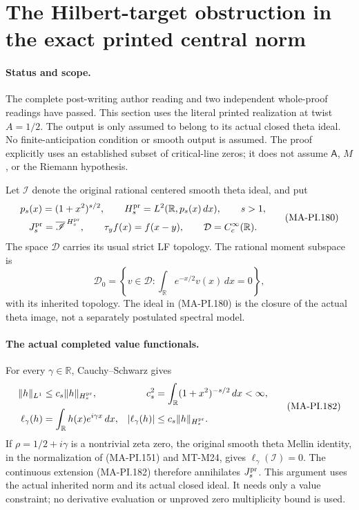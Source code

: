 \section{The Hilbert-target obstruction in the exact printed central norm}
\label{sec:printed-hilbert-cutoff-obstruction}

\paragraph{Status and scope.}
The complete post-writing author reading and two independent
whole-proof readings have passed.
This section uses the literal printed realization at twist \(A=1/2\).
The output is only assumed to belong to its actual closed theta ideal.
No finite-anticipation condition or smooth output is assumed.
The proof explicitly uses an established subset of critical-line zeros;
it does not assume \(\mathsf A\), \(M\), or the Riemann hypothesis.

Let \(\mathscr I\) denote the original rational centered smooth theta
ideal, and put
\[
 \begin{gathered}
 p_s(x)=(1+x^2)^{s/2},\qquad
 H_s^{\rm pr}=L^2(\mathbb R,p_s(x)\,dx),\qquad s>1,\\
 J_s^{\rm pr}=\overline{\mathscr I}^{\,H_s^{\rm pr}},\qquad
 \tau_yf(x)=f(x-y),\qquad \mathcal D=C_c^\infty(\mathbb R).
 \end{gathered}
 \tag{MA-PI.180}
\]
The space \(\mathcal D\) carries its usual strict LF topology.
The rational moment subspace is
\[
 \mathcal D_0=\left\{v\in\mathcal D:
                   \int_{\mathbb R}e^{-x/2}v(x)\,dx=0\right\},
 \tag{MA-PI.181}
\]
with its inherited topology. The ideal in (MA-PI.180) is the
closure of the actual theta image, not a separately postulated
spectral model.

\paragraph{The actual completed value functionals.}
For every \(\gamma\in\mathbb R\), Cauchy--Schwarz gives
\[
 \begin{aligned}
 \|h\|_{L^1}
   &\le c_s\|h\|_{H_s^{\rm pr}},&
 c_s^2&=\int_{\mathbb R}(1+x^2)^{-s/2}\,dx<\infty,\\
 \ell_\gamma(h)&=\int_{\mathbb R}h(x)e^{i\gamma x}\,dx,&
 |\ell_\gamma(h)|&\le c_s\|h\|_{H_s^{\rm pr}}.
 \end{aligned}
 \tag{MA-PI.182}
\]
If \(\rho=1/2+i\gamma\) is a nontrivial zeta zero, the original
smooth theta Mellin identity, in the normalization of
(MA-PI.151) and MT-M24, gives \(\ell_\gamma(\mathscr I)=0\).
The continuous extension (MA-PI.182) therefore annihilates
\(J_s^{\rm pr}\). This argument uses the actual inherited norm
and its actual closed ideal. It needs only a value constraint;
no derivative evaluation or unproved zero multiplicity bound
is used.

